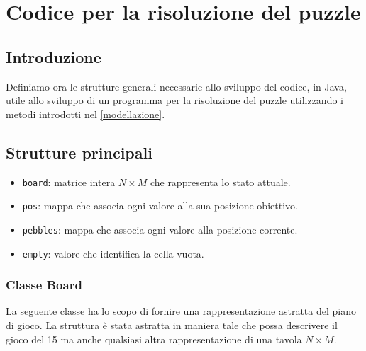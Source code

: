 \chapter{Codice per la risoluzione del puzzle}
\label{codice}
\section{Introduzione}
Definiamo ora le strutture generali necessarie allo sviluppo del codice, in Java, utile allo sviluppo di un programma per la risoluzione del puzzle utilizzando i metodi introdotti nel \cref{modellazione}. 


\section{Strutture principali}
\begin{itemize}
    \item \texttt{board}: matrice intera \( N \times M \) che rappresenta lo stato attuale.
    \item \texttt{pos}: mappa che associa ogni valore alla sua posizione obiettivo.
    \item \texttt{pebbles}: mappa che associa ogni valore alla posizione corrente.
    \item \texttt{empty}: valore che identifica la cella vuota.
\end{itemize}

\subsection{Classe Board}
La seguente classe ha lo scopo di fornire una rappresentazione astratta del piano di gioco. 
La struttura è stata astratta in maniera tale che possa descrivere il gioco del 15 ma anche qualsiasi altra rappresentazione di una tavola $N \times M$. 

